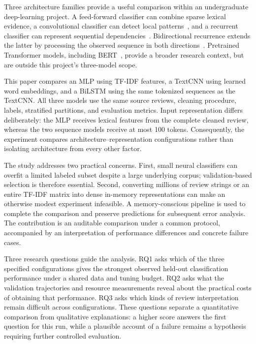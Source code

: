Three architecture families provide a useful comparison within an undergraduate deep-learning project. A feed-forward classifier can combine sparse lexical evidence, a convolutional classifier can detect local patterns~\cite{kim2014}, and a recurrent classifier can represent sequential dependencies~\cite{hochreiter1997}. Bidirectional recurrence extends the latter by processing the observed sequence in both directions~\cite{schuster1997}. Pretrained Transformer models, including BERT~\cite{devlin2019}, provide a broader research context, but are outside this project's three-model scope.

This paper compares an MLP using TF-IDF features, a TextCNN using learned word embeddings, and a BiLSTM using the same tokenized sequences as the TextCNN. All three models use the same source reviews, cleaning procedure, labels, stratified partitions, and evaluation metrics. Input representation differs deliberately: the MLP receives lexical features from the complete cleaned review, whereas the two sequence models receive at most 100 tokens. Consequently, the experiment compares architecture--representation configurations rather than isolating architecture from every other factor.

The study addresses two practical concerns. First, small neural classifiers can overfit a limited labeled subset despite a large underlying corpus; validation-based selection is therefore essential. Second, converting millions of review strings or an entire TF-IDF matrix into dense in-memory representations can make an otherwise modest experiment infeasible. A memory-conscious pipeline is used to complete the comparison and preserve predictions for subsequent error analysis. The contribution is an auditable comparison under a common protocol, accompanied by an interpretation of performance differences and concrete failure cases.


Three research questions guide the analysis. RQ1 asks which of the three specified configurations gives the strongest observed held-out classification performance under a shared data and tuning budget. RQ2 asks what the validation trajectories and resource measurements reveal about the practical costs of obtaining that performance. RQ3 asks which kinds of review interpretation remain difficult across configurations. These questions separate a quantitative comparison from qualitative explanations: a higher score answers the first question for this run, while a plausible account of a failure remains a hypothesis requiring further controlled evaluation.

